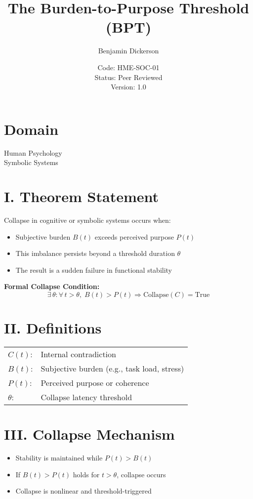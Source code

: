 \documentclass[12pt]{article}
\title{The Burden-to-Purpose Threshold (BPT)}
\author{Benjamin Dickerson}
\date{Code: HME-SOC-01 \\ Status: Peer Reviewed \\ Version: 1.0}
\begin{document}
\maketitle

\section*{Domain}
Human Psychology \\
Symbolic Systems

\section*{I. Theorem Statement}

Collapse in cognitive or symbolic systems occurs when:

\begin{itemize}
  \item Subjective burden \( B(t) \) exceeds perceived purpose \( P(t) \)
  \item This imbalance persists beyond a threshold duration \( \theta \)
  \item The result is a sudden failure in functional stability
\end{itemize}

\textbf{Formal Collapse Condition:}
\[
\exists\, \theta : \forall\, t > \theta,\; B(t) > P(t) \Rightarrow \text{Collapse}(C) = \text{True}
\]

\section*{II. Definitions}

\begin{tabular}{ll}
\( C(t) \): & Internal contradiction \\
\( B(t) \): & Subjective burden (e.g., task load, stress) \\
\( P(t) \): & Perceived purpose or coherence \\
\( \theta \): & Collapse latency threshold \\
\end{tabular}

\section*{III. Collapse Mechanism}

\begin{itemize}
  \item Stability is maintained while \( P(t) > B(t) \)
  \item If \( B(t) > P(t) \) holds for \( t > \theta \), collapse occurs
  \item Collapse is nonlinear and threshold-triggered
\end{itemize}
\end{document}

